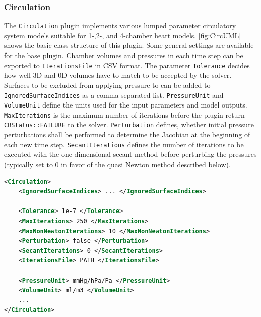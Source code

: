 \subsubsection{Circulation}
\label{plugin:Circulation}

The \verb|Circulation| plugin implements various lumped parameter circulatory system models suitable for 1-,2-, and 4-chamber heart models.
\autoref{fig:CircUML} shows the basic class structure of this plugin.
Some general settings are available for the base plugin.
Chamber volumes and pressures in each time step can be exported to \verb|IterationsFile| in CSV format.
The parameter \verb|Tolerance| decides how well 3D and 0D volumes have to match to be accepted by the solver.
Surfaces to be excluded from applying pressure to can be added to \verb|IgnoredSurfaceIndices| as a comma separated list.
\verb|PressureUnit| and \verb|VolumeUnit| define the units used for the input parameters and model outputs.
\verb|MaxIterations| is the maximum number of iterations before the plugin return \verb|CBStatus::FAILURE| to the solver.
\verb|Perturbation| defines, whether initial pressure perturbations shall be performed to determine the Jacobian at the beginning of each new time step.
\verb|SecantIterations| defines the number of iterations to be executed with the one-dimensional secant-method before perturbing the pressures (typically set to 0 in favor of the quasi Newton method described below).

\begin{lstlisting}[language=XML,caption=.xml settings for the circulation plugin]
<Circulation>
    <IgnoredSurfaceIndices> ... </IgnoredSurfaceIndices>

    <Tolerance> 1e-7 </Tolerance>
    <MaxIterations> 250 </MaxIterations>
    <MaxNonNewtonIterations> 10 </MaxNonNewtonIterations>
    <Perturbation> false </Perturbation>
    <SecantIterations> 0 </SecantIterations>
    <IterationsFile> PATH </IterationsFile>
    
    <PressureUnit> mmHg/hPa/Pa </PressureUnit>
    <VolumeUnit> ml/m3 </VolumeUnit>
    ...
</Circulation>

\end{lstlisting}

